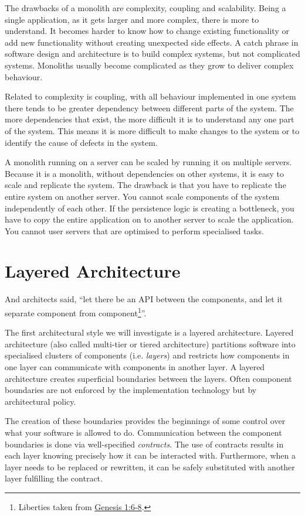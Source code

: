 The drawbacks of a monolith are complexity, coupling and scalability.
Being a single application, as it gets larger and more complex, there is more to understand.
It becomes harder to know how to change existing functionality or add new functionality without creating unexpected side effects.
A catch phrase in software design and architecture is to build complex systems, but not complicated systems.
Monoliths usually become complicated as they grow to deliver complex behaviour.

Related to complexity is coupling, with all behaviour implemented in one system
there tends to be greater dependency between different parts of the system.
The more dependencies that exist, the more difficult it is to understand any one part of the system.
This means it is more difficult to make changes to the system or to identify the cause of defects in the system.

A monolith running on a server can be scaled by running it on multiple servers.
Because it is a monolith, without dependencies on other systems, it is easy to scale and replicate the system.
The drawback is that you have to replicate the entire system on another server.
You cannot scale components of the system independently of each other.
If the persistence logic is creating a bottleneck, you have to copy the entire application on to another server to scale the application.
You cannot user servers that are optimised to perform specialised tasks.

\section{Layered Architecture}

And architects said, ``let there be an API between the components,
and let it separate component from component\footnote{Liberties taken from
\href{https://www.biblegateway.com/passage/?search=gen+1\&version=ESV}{Genesis 1:6-8}.}''.

The first architectural style we will investigate is a layered architecture.
Layered architecture (also called multi-tier or tiered architecture) 
partitions software into specialised clusters of components (i.e. \emph{layers})
and restricts how components in one layer can communicate with components in another layer.
A layered architecture creates superficial boundaries between the layers.
Often component boundaries are not enforced by the implementation technology but by architectural policy.

The creation of these boundaries provides the beginnings of some control over what your software is allowed to do.
Communication between the component boundaries is done via well-specified \emph{contracts}.
The use of contracts results in each layer knowing precisely how it can be interacted with.
Furthermore, when a layer needs to be replaced or rewritten, it can be safely substituted with another layer fulfilling the contract.

